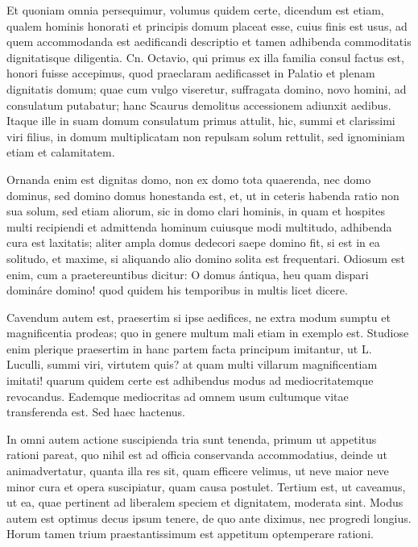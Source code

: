  Et quoniam omnia persequimur, volumus quidem certe, dicendum est etiam, qualem hominis honorati et principis domum placeat esse, cuius finis est usus, ad quem accommodanda est aedificandi descriptio et tamen adhibenda commoditatis dignitatisque diligentia. Cn. Octavio, qui primus ex illa familia consul factus est, honori fuisse accepimus, quod praeclaram aedificasset in Palatio et plenam dignitatis domum; quae cum vulgo viseretur, suffragata domino, novo homini, ad consulatum putabatur; hanc Scaurus demolitus accessionem adiunxit aedibus. Itaque ille in suam domum consulatum primus attulit, hic, summi et clarissimi viri filius, in domum multiplicatam non repulsam solum rettulit, sed ignominiam etiam et calamitatem.

 Ornanda enim est dignitas domo, non ex domo tota quaerenda, nec domo dominus, sed domino domus honestanda est, et, ut in ceteris habenda ratio non sua solum, sed etiam aliorum, sic in domo clari hominis, in quam et hospites multi recipiendi et admittenda hominum cuiusque modi multitudo, adhibenda cura est laxitatis; aliter ampla domus dedecori saepe domino fit, si est in ea solitudo, et maxime, si aliquando alio domino solita est frequentari. Odiosum est enim, cum a praetereuntibus dicitur: O domus ántiqua, heu quam dispari domináre domino! quod quidem his temporibus in multis licet dicere.

 Cavendum autem est, praesertim si ipse aedifices, ne extra modum sumptu et magnificentia prodeas; quo in genere multum mali etiam in exemplo est. Studiose enim plerique praesertim in hanc partem facta principum imitantur, ut L. Luculli, summi viri, virtutem quis? at quam multi villarum magnificentiam imitati! quarum quidem certe est adhibendus modus ad mediocritatemque revocandus. Eademque mediocritas ad omnem usum cultumque vitae transferenda est. Sed haec hactenus.

 In omni autem actione suscipienda tria sunt tenenda, primum ut appetitus rationi pareat, quo nihil est ad officia conservanda accommodatius, deinde ut animadvertatur, quanta illa res sit, quam efficere velimus, ut neve maior neve minor cura et opera suscipiatur, quam causa postulet. Tertium est, ut caveamus, ut ea, quae pertinent ad liberalem speciem et dignitatem, moderata sint. Modus autem est optimus decus ipsum tenere, de quo ante diximus, nec progredi longius. Horum tamen trium praestantissimum est appetitum optemperare rationi.

